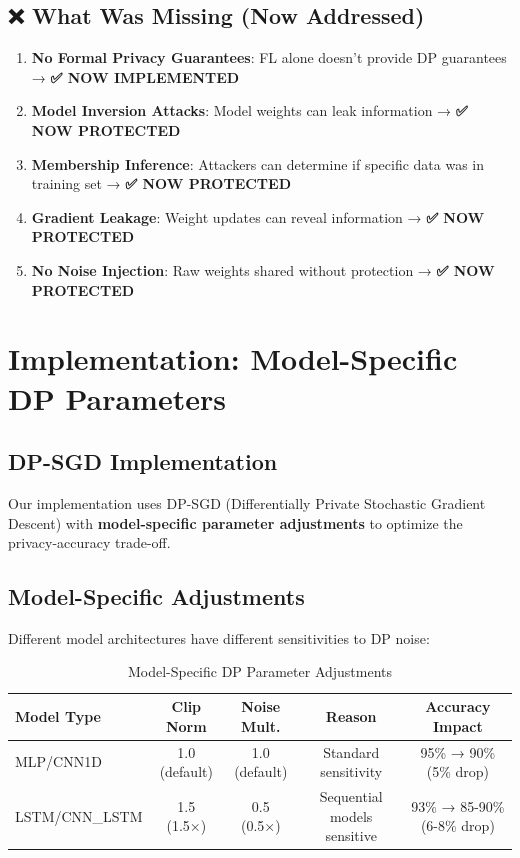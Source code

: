 \documentclass[12pt,a4paper]{article}
\begin{document}
\subsection{❌ What Was Missing (Now Addressed)}

\begin{enumerate}
    \item \textbf{No Formal Privacy Guarantees}: FL alone doesn't provide DP guarantees → \textbf{✅ NOW IMPLEMENTED}
    \item \textbf{Model Inversion Attacks}: Model weights can leak information → \textbf{✅ NOW PROTECTED}
    \item \textbf{Membership Inference}: Attackers can determine if specific data was in training set → \textbf{✅ NOW PROTECTED}
    \item \textbf{Gradient Leakage}: Weight updates can reveal information → \textbf{✅ NOW PROTECTED}
    \item \textbf{No Noise Injection}: Raw weights shared without protection → \textbf{✅ NOW PROTECTED}
\end{enumerate}

\section{Implementation: Model-Specific DP Parameters}

\subsection{DP-SGD Implementation}

Our implementation uses DP-SGD (Differentially Private Stochastic Gradient Descent) with \textbf{model-specific parameter adjustments} to optimize the privacy-accuracy trade-off.

\subsection{Model-Specific Adjustments}

Different model architectures have different sensitivities to DP noise:

\begin{table}[h]
\centering
\begin{tabular}{@{}lcccc@{}}
\toprule
\textbf{Model Type} & \textbf{Clip Norm} & \textbf{Noise Mult.} & \textbf{Reason} & \textbf{Accuracy Impact} \\
\midrule
MLP/CNN1D & 1.0 (default) & 1.0 (default) & Standard sensitivity & 95\% → 90\% (5\% drop) \\
LSTM/CNN\_LSTM & 1.5 (1.5×) & 0.5 (0.5×) & Sequential models sensitive & 93\% → 85-90\% (6-8\% drop) \\
\bottomrule
\end{tabular}
\caption{Model-Specific DP Parameter Adjustments}
\end{table}
\end{document}
